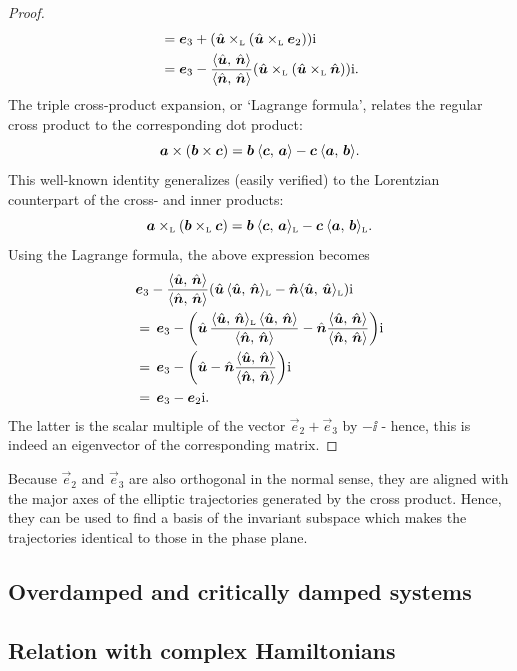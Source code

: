 \begin{proof}
\begin{equation*}
\begin{split}
            &=\vec{e}_3 +  \qty(\lorcrossp{\uvec{u}}{\qty(\lorcrossp{\uvec{u}}{\vec{e}_2})})\ii \\
            &=\vec{e}_3 -  \frac{ \inner{\uvec{u}}{\uvec{n}} }{ \inner{\uvec{n}}{\uvec{n}} }\qty(\lorcrossp{\uvec{u}}{\qty(\lorcrossp{\uvec{u}}{\uvec{n}})})\ii.  \\
        \end{split}
    \end{equation*}
The triple cross-product expansion, or `Lagrange formula', relates the regular cross product to the corresponding dot product:
    $$ \vec{a}\times\qty(\vec{b}\times\vec{c}) = \vec{b}\:\inner{\vec{c}}{\vec{a}} - \vec{c}\:\inner{\vec{a}}{\vec{b}}. $$
This well-known identity generalizes (easily verified) to the Lorentzian counterpart of the cross- and inner products:
    $$ 
        \lorcrossp{\vec{a}}{\qty(\lorcrossp{\vec{b}}{\vec{c}})} 
       = \vec{b}\:\lorinner{\vec{c}}{\vec{a}} - \vec{c}\:\lorinner{\vec{a}}{\vec{b}}. 
    $$
Using the Lagrange formula, the above expression becomes
    \begin{equation*}
        \begin{split}
            & \vec{e}_3 - \frac{ \inner{\uvec{u}}{\uvec{n}} }{ \inner{\uvec{n}}{\uvec{n}} }\qty(\uvec{u}\,\lorinner{\uvec{u}}{\uvec{n}} - \uvec{n}\lorinner{\uvec{u}}{\uvec{u}})\ii \\
            & =\, \vec{e}_3 - \qty(\uvec{u}\,\frac{ \lorinner{\uvec{u}}{\uvec{n}} \, \inner{\uvec{u}}{\uvec{n}} }{ \inner{\uvec{n}}{\uvec{n}} } - \uvec{n}\frac{ \inner{\uvec{u}}{\uvec{n}} }{ \inner{\uvec{n}}{\uvec{n}} })\ii \\
            & =\, \vec{e}_3 - \qty(\uvec{u} - \uvec{n}\frac{ \inner{\uvec{u}}{\uvec{n}} }{ \inner{\uvec{n}}{\uvec{n}} })\ii \\
            & =\, \vec{e}_3 - \vec{e}_2\ii. 
        \end{split}
    \end{equation*}
    The latter is the scalar multiple of the vector $\vec{e}_2 + \vec{e}_3$ by $-\ii$ - hence, this is indeed an eigenvector of the corresponding matrix.
\end{proof}
Because $\vec{e}_2$ and $\vec{e}_3$ are also orthogonal in the normal sense, they are aligned with the major axes of the elliptic trajectories generated by the cross product. Hence, they can be used to find a basis of the invariant subspace which makes the trajectories identical to those in the phase plane.

\subsection{Overdamped and critically damped systems}

\subsection{Relation with complex Hamiltonians}
\label{ssec:complex_ham}
